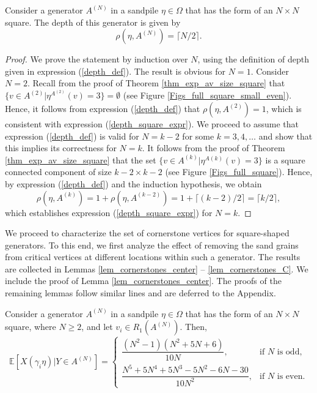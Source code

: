 \documentclass{article}
\begin{document}
\begin{theorem}\label{thm_depth_square}
Consider a generator $A^{(N)}$ in a sandpile $\eta \in \Omega$ that has the form of an $N\times N$ square. The depth of this generator is given by 
\begin{equation}\label{depth_square_expr}
    \rho(\eta, A^{(N)}) = \lceil N/2 \rceil.
\end{equation}
\end{theorem}
\begin{proof}
We prove the statement by induction over $N$, using the definition of depth given in expression (\ref{depth_def}). The result is obvious for $N = 1$. Consider $N = 2$. Recall from the proof of Theorem \ref{thm_exp_av_size_square} that $\{v \in A^{(2)}|\eta^{A^{(2)}}(v) = 3\} = \emptyset$ (see Figure \ref{Figs_full_square_small_even}). Hence, it follows from expression (\ref{depth_def}) that $\rho(\eta, A^{(2)}) = 1$, which is consistent with expression (\ref{depth_square_expr}). We proceed to assume that expression (\ref{depth_def}) is valid for $N = k-2$ for some $k = 3, 4, \ldots$ and show that this implies its correctness for $N = k$. It follows from the proof of Theorem \ref{thm_exp_av_size_square} that the set $\{v \in A^{(k)}|\eta^{A(k)}(v) = 3\}$ is a square connected component of size $k-2 \times k-2$ (see Figure \ref{Figs_full_square}). Hence, by expression (\ref{depth_def}) and the induction hypothesis, we obtain
\begin{equation}
    \rho(\eta, A^{(k)}) = 1 + \rho(\eta, A^{(k-2)}) = 1 + \lceil (k-2)/2 \rceil = \lceil k/2 \rceil,
\end{equation}
which establishes expression (\ref{depth_square_expr}) for $N = k$. 
\end{proof}


We proceed to characterize the set of cornerstone vertices for square-shaped generators. To this end, we first analyze the effect of removing the sand grains from critical vertices at different locations within such a generator. The results are collected in Lemmas \ref{lem_cornerstones_center} -- \ref{lem_cornerstones_C}. We include the proof of Lemma \ref{lem_cornerstones_center}. The proofs of the remaining lemmas follow similar lines and are deferred to the Appendix. 

\begin{lemma}\label{lem_cornerstones_center}
Consider a generator $A^{(N)}$ in a sandpile $\eta \in \Omega$ that has the form of an $N \times N$ square, where $N \geq 2$, and let $v_i \in R_1(A^{(N)})$. Then,
\begin{equation}\label{Exp_av_size_center}
\mathbb{E}[X(\gamma_i \eta)|Y \in A^{(N)}] = \begin{cases}
    \dfrac{(N^2-1)(N^2+5N+6)}{10N}, &\text{if } N \text{ is odd}, \\[1.2em]
    \dfrac{N^5+5N^4+5N^3-5N^2-6N-30}{10N^2}, &\text{if } N \text{ is even.}
    \end{cases}
\end{equation}
\end{lemma}
\end{document}
